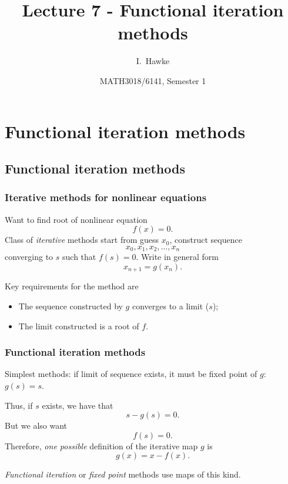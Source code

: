 \documentclass{beamer}
\title[Lecture 7] %
{Lecture 7 - Functional iteration methods}
\author[I. Hawke] %
{I.~Hawke}
\institute[University of Southampton] %
{
  School of Mathematics, \\
  University of Southampton, UK
}
\date[Semester 1] %
{MATH3018/6141, Semester 1}
\begin{document}
\begin{frame}
  \titlepage
\end{frame}


\section{Functional iteration methods}

\subsection{Functional iteration methods}

\begin{frame}
  \frametitle{Iterative methods for nonlinear equations}

  Want to find root of nonlinear equation
  \begin{equation*}
    f(x) = 0. %
  \end{equation*}
  Class of  \emph{iterative} methods start from guess $x_0$, construct sequence
  \begin{equation*}
    x_0, x_1, x_2, \dots, x_n
  \end{equation*}
  converging to $s$ such that $f(s) = 0$. \pause Write in general form
  \begin{equation*}
    x_{n+1} = g(x_n).
  \end{equation*} \pause

  Key requirements for the method are
  \begin{itemize}
  \item The sequence constructed by $g$ converges to a limit ($s$);
    \pause
  \item The limit constructed is a root of $f$.
  \end{itemize}


\end{frame}

\begin{frame}
  \frametitle{Functional iteration methods}

  Simplest methods: if limit of sequence exists, it must be fixed point of $g$: $g(s) = s$. \pause

  \vspace{1ex}

  Thus, if $s$ exists, we have that
  \begin{equation*}
    s - g(s) = 0.
  \end{equation*}
  But we also want
  \begin{equation*}
    f(s) = 0.
  \end{equation*} \pause
  Therefore, \emph{one possible} definition of the iterative map $g$ is
  \begin{equation*}
    g(x) = x - f(x).
  \end{equation*}

  \emph{Functional iteration} or \emph{fixed point} methods use maps of this kind.

\end{frame}
\end{document}
